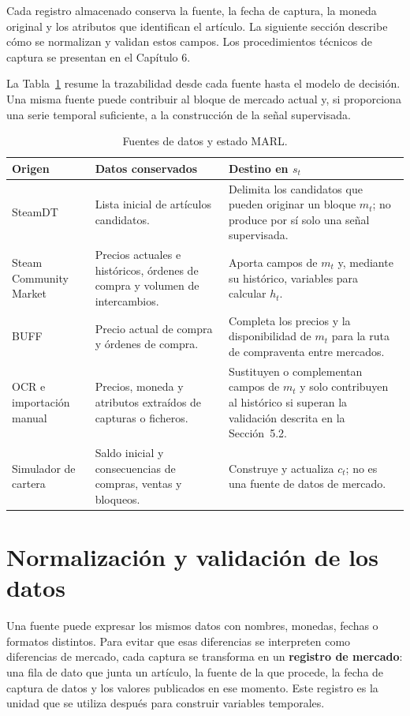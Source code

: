 \clearpage

Cada registro almacenado conserva la fuente, la fecha de captura, la moneda original y los atributos que identifican el artículo. La siguiente sección describe cómo se normalizan y validan estos campos. Los procedimientos técnicos de captura se presentan en el Capítulo 6.

La Tabla~\ref{tab:fuentes-estado-marl} resume la trazabilidad desde cada fuente hasta el modelo de decisión. Una misma fuente puede contribuir al bloque de mercado actual y, si proporciona una serie temporal suficiente, a la construcción de la señal supervisada.

\begin{table}[H]
\centering
\caption{Fuentes de datos y estado MARL.}
\label{tab:fuentes-estado-marl}
\begin{tabularx}{\textwidth}{@{}p{}p{}X@{}}
\toprule
\textbf{Origen} & \textbf{Datos conservados} & \textbf{Destino en $s_t$} \\
\midrule
SteamDT & Lista inicial de artículos candidatos. & Delimita los candidatos que pueden originar un bloque $m_t$; no produce por sí solo una señal supervisada. \\
Steam Community Market & Precios actuales e históricos, órdenes de compra y volumen de intercambios. & Aporta campos de $m_t$ y, mediante su histórico, variables para calcular $h_t$. \\
BUFF & Precio actual de compra y órdenes de compra. & Completa los precios y la disponibilidad de $m_t$ para la ruta de compraventa entre mercados. \\
OCR e importación manual & Precios, moneda y atributos extraídos de capturas o ficheros. & Sustituyen o complementan campos de $m_t$ y solo contribuyen al histórico si superan la validación descrita en la Sección~5.2. \\
Simulador de cartera & Saldo inicial y consecuencias de compras, ventas y bloqueos. & Construye y actualiza $c_t$; no es una fuente de datos de mercado. \\
\bottomrule
\end{tabularx}
\end{table}

\section{Normalización y validación de los datos}

Una fuente puede expresar los mismos datos con nombres, monedas, fechas o formatos distintos. Para evitar que esas diferencias se interpreten como diferencias de mercado, cada captura se transforma en un \textbf{registro de mercado}: una fila de dato que junta un artículo, la fuente de la que procede, la fecha de captura de datos y los valores publicados en ese momento. Este registro es la unidad que se utiliza después para construir variables temporales.

